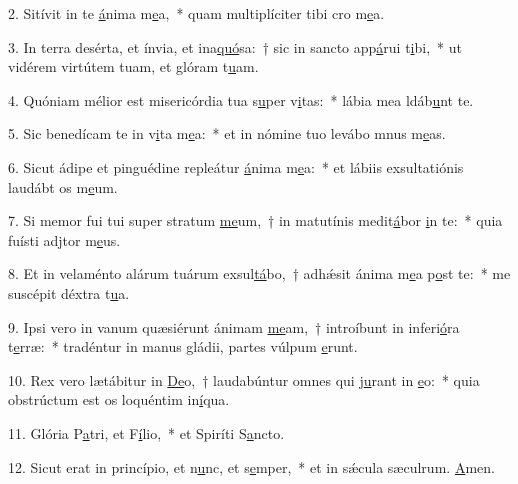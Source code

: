2. Sitívit in te \uline{á}nima m\uline{e}a,~* quam multiplíciter tibi cro m\uline{e}a.\par 
3. In terra desérta, et ínvia, et ina\uline{quó}sa:~† sic in sancto app\uline{á}rui t\uline{i}bi,~* ut vidérem virtútem tuam, et glóram t\uline{u}am.\par 
4. Quóniam mélior est misericórdia tua s\uline{u}per v\uline{i}tas:~* lábia mea ldáb\uline{u}nt te.\par 
5. Sic benedícam te in v\uline{i}ta m\uline{e}a:~* et in nómine tuo levábo mnus m\uline{e}as.\par 
6. Sicut ádipe et pinguédine repleátur \uline{á}nima m\uline{e}a:~* et lábiis exsultatiónis laudábt os m\uline{e}um.\par 
7. Si memor fui tui super stratum \uline{me}um,~† in matutínis medit\uline{á}bor \uline{i}n te:~* quia fuísti adjtor m\uline{e}us.\par 
8. Et in velaménto alárum tuárum exsul\uline{tá}bo,~† adhǽsit ánima m\uline{e}a p\uline{o}st te:~* me suscépit déxtra t\uline{u}a.\par 
9. Ipsi vero in vanum quæsiérunt ánimam \uline{me}am,~† introíbunt in inferi\uline{ó}ra t\uline{e}rræ:~* tradéntur in manus gládii, partes vúlpum \uline{e}runt.\par 
10. Rex vero lætábitur in \uline{De}o,~† laudabúntur omnes qui j\uline{u}rant in \uline{e}o:~* quia obstrúctum est os loquéntim in\uline{í}qua.\par 
11. Glória P\uline{a}tri, et F\uline{í}lio,~* et Spiríti S\uline{a}ncto.\par 
12. Sicut erat in princípio, et n\uline{u}nc, et s\uline{e}mper,~* et in sǽcula sæculrum. \uline{A}men.\par 
